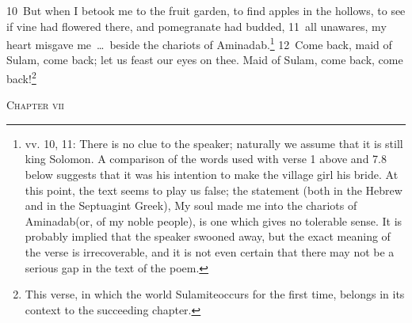 \documentclass[10pt]{book} %
\begin{document}
\textcolor{benred8}{10}~But when I betook me to the fruit garden, to find apples in the hollows, to see if vine had flowered there, and pomegranate had budded, \textcolor{benred8}{11}~all unawares, my heart misgave me~\ldots\  beside the chariots of Aminadab.\footnote[3]{vv. 10, 11: There is no clue to the speaker; naturally we assume that it is still king Solomon. A comparison of the words used with verse 1 above and 7.8 below suggests that it was his intention to make the village girl his bride. At this point, the text seems to play us false; the statement (both in the Hebrew and in the Septuagint Greek), \textasciigrave My soul made me into the chariots of Aminadab\textquotesingle  (or, of my noble people), is one which gives no tolerable sense. It is probably implied that the speaker swooned away, but the exact meaning of the verse is irrecoverable, and it is not even certain that there may not be a serious gap in the text of the poem.}
\textcolor{benred8}{12}~Come back, maid of Sulam, come back; let us feast our eyes on thee. Maid of Sulam, come back, come back!\footnote[4]{This verse, in which the world \textasciigrave Sulamite\textquotesingle  occurs for the first time, belongs in its context to the succeeding chapter.}
\begin{large}\begin{center}\textsc{Chapter vii}\end{center}\end{large}
\end{document}
